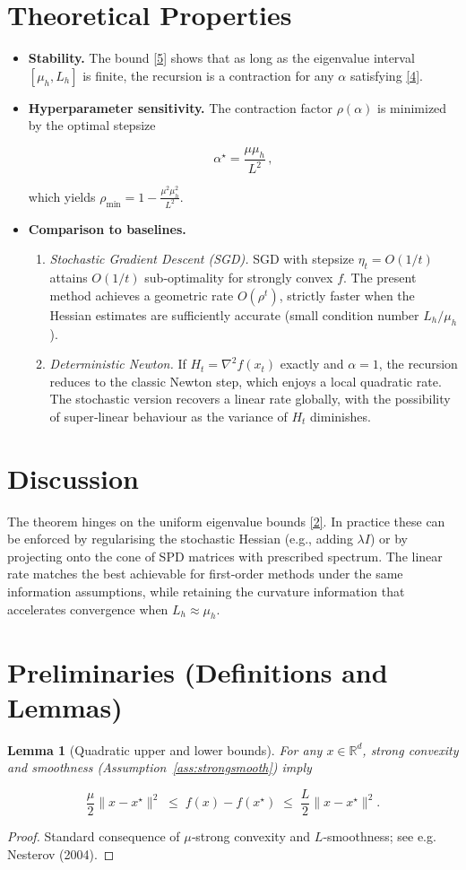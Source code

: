 \documentclass{article}
\newtheorem{lemma}{Lemma}
\newcommand{\R}{\mathbb{R}}
\begin{document}
\section*{Theoretical Properties}
\begin{itemize}
\item \textbf{Stability.}  The bound \eqref{5} shows that as long as the eigenvalue interval $[\mu_h,L_h]$ is finite, the recursion is a contraction for any $\alpha$ satisfying \eqref{4}.
\item \textbf{Hyperparameter sensitivity.} The contraction factor $\rho(\alpha)$ is minimized by the optimal stepsize  

\[
\alpha^{\star}= \frac{\mu\mu_h}{L^{2}}\,,
\]

which yields $\rho_{\min}=1-\frac{\mu^{2}\mu_h^{2}}{L^{2}}$.
\item \textbf{Comparison to baselines.}
    \begin{enumerate}
        \item \emph{Stochastic Gradient Descent (SGD).}  SGD with stepsize $\eta_t=O(1/t)$ attains $O(1/t)$ sub‑optimality for strongly convex $f$.  The present method achieves a geometric rate $O(\rho^{t})$, strictly faster when the Hessian estimates are sufficiently accurate (small condition number $L_h/\mu_h$).
        \item \emph{Deterministic Newton.}  If $H_t=\nabla^{2}f(x_t)$ exactly and $\alpha=1$, the recursion reduces to the classic Newton step, which enjoys a local quadratic rate.  The stochastic version recovers a linear rate globally, with the possibility of super‑linear behaviour as the variance of $H_t$ diminishes.
    \end{enumerate}
\end{itemize}

\section*{Discussion}
The theorem hinges on the uniform eigenvalue bounds \eqref{2}.  In practice these can be enforced by regularising the stochastic Hessian (e.g., adding $\lambda I$) or by projecting onto the cone of SPD matrices with prescribed spectrum.  The linear rate matches the best achievable for first‑order methods under the same information assumptions, while retaining the curvature information that accelerates convergence when $L_h\approx\mu_h$.

\newpage
\section*{Preliminaries (Definitions and Lemmas)}
\begin{lemma}[Quadratic upper and lower bounds]\label{lem:quad}
For any $x\in\R^{d}$, strong convexity and smoothness (Assumption~\ref{ass:strongsmooth}) imply  

\[
\frac{\mu}{2}\|x-x^{\star}\|^{2}
\;\le\;
f(x)-f(x^{\star})
\;\le\;
\frac{L}{2}\|x-x^{\star}\|^{2}.
\tag{7}
\]
\end{lemma}
\begin{proof}
Standard consequence of $\mu$‑strong convexity and $L$‑smoothness; see e.g. Nesterov (2004). \qedhere
\end{proof}
\end{document}
